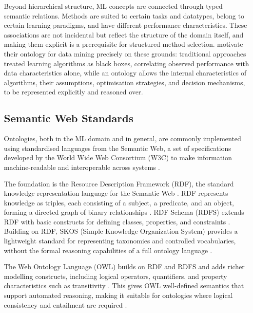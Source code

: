Beyond hierarchical structure, ML concepts are connected through 
typed semantic relations.
Methods are suited to certain tasks and datatypes, belong to certain learning 
paradigms, and have different performance characteristics.
These associations are not incidental but reflect the structure of 
the domain itself, and making them explicit is a prerequisite for 
structured method selection.
\textcite{keet2015data_mining_optimization_ontology} motivate their 
ontology for data mining precisely on these grounds: traditional 
approaches treated learning algorithms as black boxes, correlating 
observed performance with data characteristics alone, while an 
ontology allows the internal characteristics of algorithms, their 
assumptions, optimisation strategies, and decision mechanisms, to 
be represented explicitly and reasoned over.

\subsection{Semantic Web Standards}

Ontologies, both in the ML domain and in general, are commonly implemented using
standardised languages from the Semantic Web, a set of
specifications developed by the World Wide Web Consortium
(W3C) to make information machine-readable and interoperable
across systems \parencite{w3c}.

The foundation is the Resource Description Framework (RDF),
the standard knowledge representation language for the Semantic
Web \parencite{gibbins2009resource_description_framework_rdf}.
RDF represents knowledge as triples, each consisting of a
subject, a predicate, and an object, forming a directed graph
of binary relationships
\parencite{gibbins2009resource_description_framework_rdf}.
RDF Schema (RDFS) extends RDF with basic constructs for
defining classes, properties, and constraints
\parencite{gibbins2009resource_description_framework_rdf}.
Building on RDF, SKOS (Simple Knowledge Organization System)
provides a lightweight standard for representing taxonomies
and controlled vocabularies, without the formal reasoning
capabilities of a full ontology language
\parencite{humm2026industry_ready_machine_learning_ontology}.

The Web Ontology Language (OWL) builds on RDF and RDFS and
adds richer modelling constructs, including logical operators,
quantifiers, and property characteristics such as transitivity
\parencite{bechhofer2009owl_web_ontology_language}.
This gives OWL well-defined semantics that support automated
reasoning, making it suitable for ontologies where logical
consistency and entailment are required
\parencite{bechhofer2009owl_web_ontology_language}.

